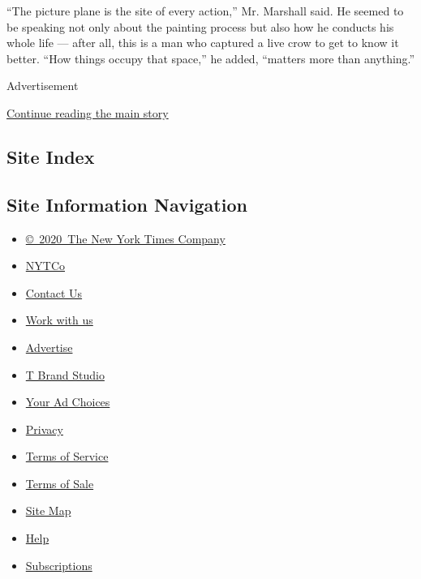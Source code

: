 ``The picture plane is the site of every action,'' Mr. Marshall said. He
seemed to be speaking not only about the painting process but also how
he conducts his whole life --- after all, this is a man who captured a
live crow to get to know it better. ``How things occupy that space,'' he
added, ``matters more than anything.''

Advertisement

\protect\hyperlink{after-bottom}{Continue reading the main story}

\hypertarget{site-index}{%
\subsection{Site Index}\label{site-index}}

\hypertarget{site-information-navigation}{%
\subsection{Site Information
Navigation}\label{site-information-navigation}}

\begin{itemize}
\tightlist
\item
  \href{https://help.nytimes.com/hc/en-us/articles/115014792127-Copyright-notice}{©~2020~The
  New York Times Company}
\end{itemize}

\begin{itemize}
\tightlist
\item
  \href{https://www.nytco.com/}{NYTCo}
\item
  \href{https://help.nytimes.com/hc/en-us/articles/115015385887-Contact-Us}{Contact
  Us}
\item
  \href{https://www.nytco.com/careers/}{Work with us}
\item
  \href{https://nytmediakit.com/}{Advertise}
\item
  \href{http://www.tbrandstudio.com/}{T Brand Studio}
\item
  \href{https://www.nytimes.com/privacy/cookie-policy\#how-do-i-manage-trackers}{Your
  Ad Choices}
\item
  \href{https://www.nytimes.com/privacy}{Privacy}
\item
  \href{https://help.nytimes.com/hc/en-us/articles/115014893428-Terms-of-service}{Terms
  of Service}
\item
  \href{https://help.nytimes.com/hc/en-us/articles/115014893968-Terms-of-sale}{Terms
  of Sale}
\item
  \href{https://spiderbites.nytimes.com}{Site Map}
\item
  \href{https://help.nytimes.com/hc/en-us}{Help}
\item
  \href{https://www.nytimes.com/subscription?campaignId=37WXW}{Subscriptions}
\end{itemize}
